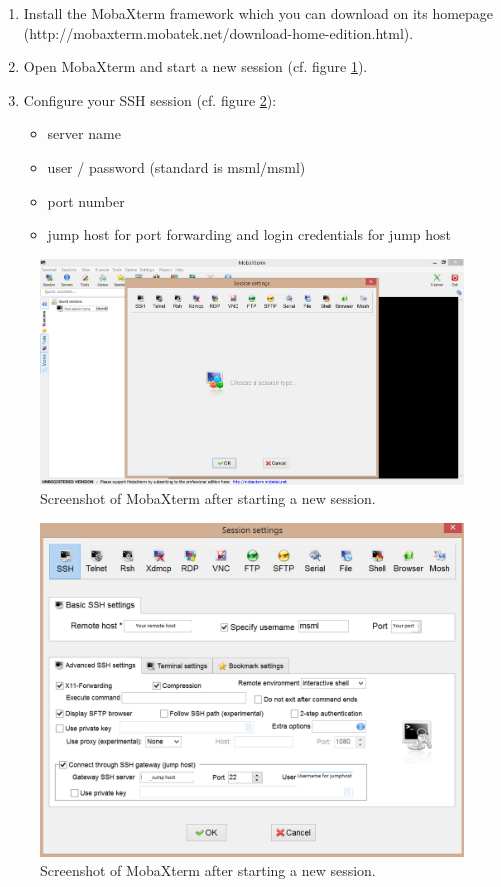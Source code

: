 \begin{enumerate}
	\item Install the MobaXterm framework which you can download on its homepage (http://mobaxterm.mobatek.net/download-home-edition.html).
	\item Open MobaXterm and start a new session (cf. figure \ref{mobaXtermNewSession}).
	\item Configure your SSH session (cf. figure \ref{mobaXtermSessionConfig}):
		\begin{itemize}
 			 \item server name
 			 \item user / password (standard is msml/msml)
 			 \item port number
 			 \item jump host for port forwarding and login credentials for jump host
		\end{itemize}	
\end{enumerate} 

\begin{figure}[h]
  	\centering
    \includegraphics[width=\textwidth]{pictures/MobaXterm_newSession}
    \caption{Screenshot of MobaXterm after starting a new session.}
    \label{mobaXtermNewSession}
\end{figure}

 
\begin{figure}[h]
  	\centering
    \includegraphics[width=\textwidth]{pictures/MobaXterm_SessionConfig}
    \caption{Screenshot of MobaXterm after starting a new session.}
    \label{mobaXtermSessionConfig}
\end{figure}

